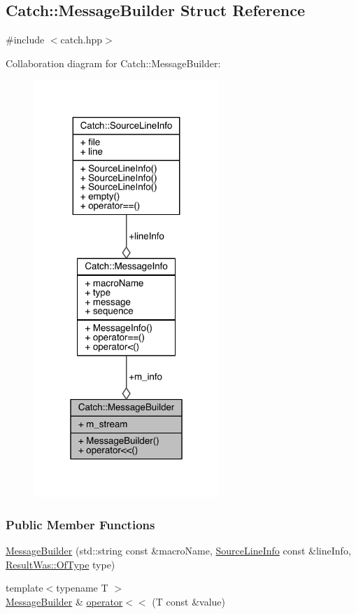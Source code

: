 \hypertarget{a00049}{}\subsection{Catch\+:\+:Message\+Builder Struct Reference}
\label{a00049}


{\ttfamily \#include $<$catch.\+hpp$>$}



Collaboration diagram for Catch\+:\+:Message\+Builder\+:\nopagebreak
\begin{figure}[H]
\begin{center}
\leavevmode
\includegraphics[width=199pt]{a00228}
\end{center}
\end{figure}
\subsubsection*{Public Member Functions}
\begin{DoxyCompactItemize}
\item 
\hyperlink{a00049_ab0c6378e722680bf58852c6ee2b6e724}{Message\+Builder} (std\+::string const \&macro\+Name, \hyperlink{a00075}{Source\+Line\+Info} const \&line\+Info, \hyperlink{a00069_a624e1ee3661fcf6094ceef1f654601ef}{Result\+Was\+::\+Of\+Type} type)
\item 
{\footnotesize template$<$typename T $>$ }\\\hyperlink{a00049}{Message\+Builder} \& \hyperlink{a00049_a20fa48d069b20dddcc2d3df8abb123c1}{operator$<$$<$} (T const \&value)
\end{DoxyCompactItemize}
